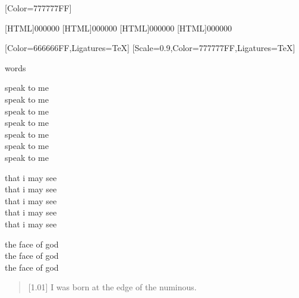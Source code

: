 \renewfontfamily{}[Color=777777FF]

[HTML]{000000}
[HTML]{000000}
[HTML]{000000}
[HTML]{000000}
\begin{paracol}{2}
[Color=666666FF,Ligatures=TeX]
\renewfontfamily{}[Scale=0.9,Color=777777FF,Ligatures=TeX]
\null
\vfill
\begin{center}
    words
\end{center}
\vfill
\newpage

\null
\vfill
{}
\begin{center}
\begin{Spacing}{0}
speak to me\\\vspace{-7pt}
speak to me\\\vspace{-7pt}
speak to me\\\vspace{-7pt}
speak to me\\\vspace{-7pt}
speak to me\\\vspace{-7pt}
speak to me\\\vspace{-7pt}
speak to me

that i may see\\\vspace{-7pt}
that i may see\\\vspace{-7pt}
that i may see\\\vspace{-7pt}
that i may see\\\vspace{-7pt}
that i may see

the face of god\\\vspace{-7pt}
the face of god\\\vspace{-7pt}
the face of god
\end{Spacing}
\end{center}
\vfill
\newpage

\begin{verse}[1.01\textwidth]
    I was born at the edge of the numinous.\vspace{-7pt}


\end{verse}
\end{paracol}
